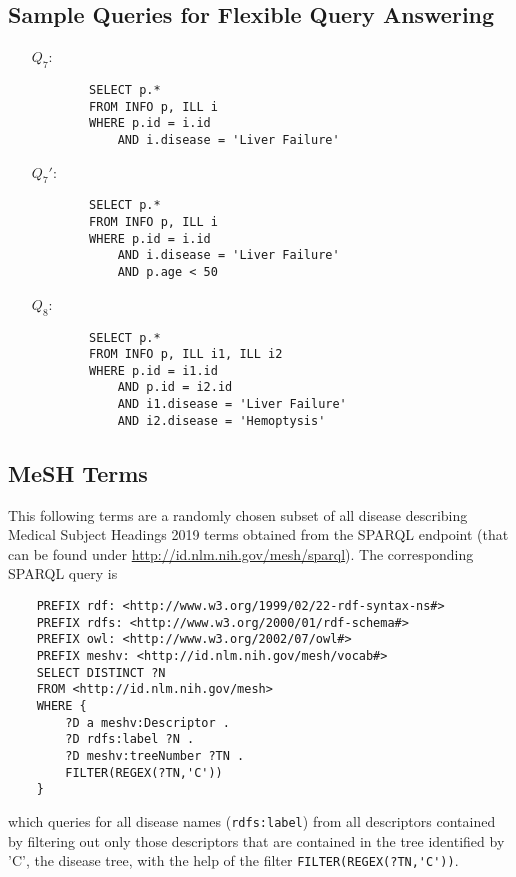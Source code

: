 \subsection{Sample Queries for Flexible Query Answering}
\label{app:flexqueries}

\begin{itemize}

    \item[$Q_7$:] \begin{verbatim}
        SELECT p.* 
        FROM INFO p, ILL i 
        WHERE p.id = i.id 
            AND i.disease = 'Liver Failure'
    \end{verbatim}
    
    \item[$Q_7'$:] \begin{verbatim}
        SELECT p.* 
        FROM INFO p, ILL i 
        WHERE p.id = i.id 
            AND i.disease = 'Liver Failure'
            AND p.age < 50
    \end{verbatim}
        
    \item[$Q_8$:] \begin{verbatim}
        SELECT p.* 
        FROM INFO p, ILL i1, ILL i2
        WHERE p.id = i1.id 
            AND p.id = i2.id 
            AND i1.disease = 'Liver Failure' 
            AND i2.disease = 'Hemoptysis'
    \end{verbatim}

\end{itemize}



\subsection{MeSH Terms}
\label{app:terms}

This following terms are a randomly chosen subset of all disease describing Medical Subject Headings 2019 terms obtained from the SPARQL endpoint 
(that can be found under \url{http://id.nlm.nih.gov/mesh/sparql}). The corresponding SPARQL query is
\begin{verbatim}
    PREFIX rdf: <http://www.w3.org/1999/02/22-rdf-syntax-ns#>
    PREFIX rdfs: <http://www.w3.org/2000/01/rdf-schema#>
    PREFIX owl: <http://www.w3.org/2002/07/owl#>
    PREFIX meshv: <http://id.nlm.nih.gov/mesh/vocab#>
    SELECT DISTINCT ?N
    FROM <http://id.nlm.nih.gov/mesh>
    WHERE { 
        ?D a meshv:Descriptor .
        ?D rdfs:label ?N .
        ?D meshv:treeNumber ?TN .
        FILTER(REGEX(?TN,'C'))
    }
\end{verbatim}
which queries for all disease names (\verb!rdfs:label!) from all descriptors contained by filtering out only those descriptors that are contained in the
tree identified by 'C', the disease tree, with the help of the filter \verb!FILTER(REGEX(?TN,'C'))!.

